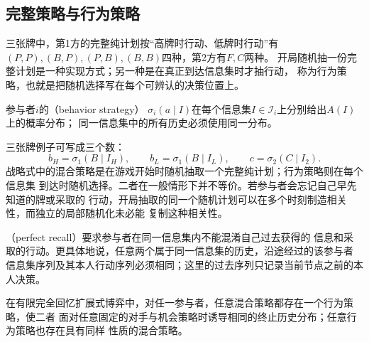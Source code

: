 \subsection{完整策略与行为策略}
\label{sec:game-complete-behavior}

三张牌中，第1方的完整纯计划按“高牌时行动、低牌时行动”有
\((P,P),(B,P),(P,B),(B,B)\)四种，第2方有\(F,C\)两种。
开局随机抽一份完整计划是一种实现方式；另一种是在真正到达信息集时才抽行动，
称为行为策略，也就是把随机选择写在每个可辨认的决策位置上。
\begin{definition}[行为策略]
\label{def:game-behavior-strategy}
参与者\(i\)的（behavior strategy）
\(\sigma_i(a\mid I)\)在每个信息集\(I\in\mathcal{I}_i\)上分别给出$A(I)$上的概率分布；
同一信息集中的所有历史必须使用同一分布。
\end{definition}
三张牌例子可写成三个数：
\[
  b_H=\sigma_1(B\mid I_H),\qquad
  b_L=\sigma_1(B\mid I_L),\qquad
  c=\sigma_2(C\mid I_2).
\]
战略式中的混合策略是在游戏开始时随机抽取一个完整纯计划；行为策略则在每个信息集
到达时随机选择。二者在一般情形下并不等价。若参与者会忘记自己早先知道的牌或采取的
行动，开局抽取的同一个随机计划可以在多个时刻制造相关性，而独立的局部随机化未必能
复制这种相关性。

\begin{definition}[完全回忆]
\label{def:game-perfect-recall}
（perfect recall）要求参与者在同一信息集内不能混淆自己过去获得的
信息和采取的行动。更具体地说，任意两个属于同一信息集的历史，沿途经过的该参与者
信息集序列及其本人行动序列必须相同；这里的过去序列只记录当前节点之前的本人决策。
\end{definition}

\begin{theorem}[Kuhn实现等价]
\label{thm:game-kuhn-equivalence}
在有限完全回忆扩展式博弈中，对任一参与者，任意混合策略都存在一个行为策略，使二者
面对任意固定的对手与机会策略时诱导相同的终止历史分布；任意行为策略也存在具有同样
性质的混合策略。
\end{theorem}

